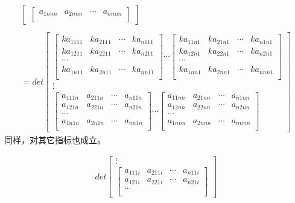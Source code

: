 \documentclass[twoside,a4paper,CCT]{cctart}   %
\begin{document}
\begin{list}{}
\begin{align*}
\begin{bmatrix}
\begin{bmatrix}
a_{1nnn}& a_{2nnn}&\cdots&a_{nnnn}\\
\end{bmatrix}
\end{bmatrix}\\
\\
=det
  \begin{bmatrix}
  \begin{bmatrix}
 ka_{1111}& ka_{2111}&\cdots&ka_{n111}\\
 ka_{1211}& ka_{2211}&\cdots&ka_{n211}\\
 \cdots\\
ka_{1n11}& ka_{2n11}&\cdots&ka_{nn11}\\
 \end{bmatrix}
\cdots
\begin{bmatrix}
ka_{11n1}& ka_{21n1}&\cdots&ka_{n1n1}\\
ka_{12n1}& ka_{22n1}&\cdots&ka_{n2n1}\\
 \cdots\\
ka_{1nn1}& ka_{2nn1}&\cdots&ka_{nnn1}\\
\end{bmatrix}\\
\vdots\\
\begin{bmatrix}
a_{111n}& a_{211n}&\cdots&a_{n11n}\\
a_{121n}& a_{221n}&\cdots&a_{n21n}\\
\cdots\\
a_{1n1n}& a_{2n1n}&\cdots&a_{nn1n}\\
\end{bmatrix}
\cdots
\begin{bmatrix}
a_{11nn}& a_{21nn}&\cdots&a_{n1nn}\\
a_{12nn}& a_{22nn}&\cdots&a_{n2nn}\\
\cdots\\
a_{1nnn}& a_{2nnn}&\cdots&a_{nnnn}\\
\end{bmatrix}
\end{bmatrix}
 \end{align*}
 同样，对其它指标也成立。
 \item
\begin{align*}
det
  \begin{bmatrix}
\vdots\\
 \begin{bmatrix}
 a_{111i}& a_{211i}&\cdots&a_{n11i}\\
 a_{121i}& a_{221i}&\cdots&a_{n21i}\\
 \cdots\\

\end{bmatrix}
\end{bmatrix}
\end{align*}
\end{list}
\end{document}
